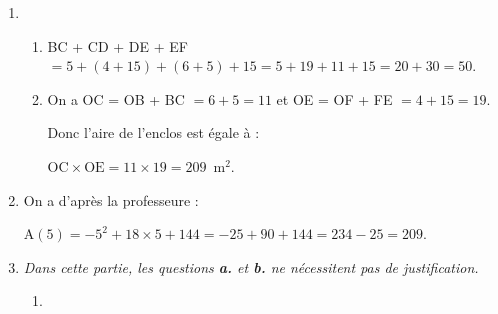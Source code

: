 \begin{enumerate}
\item %
	\begin{enumerate}
		\item %
BC + CD + DE + EF $= 5 +  (4 + 15) + (6 + 5) + 15 = 5 + 19 + 11 + 15 = 20 + 30 = 50$. 
		\item %
		On a OC = OB + BC $= 6 + 5 = 11$ et OE = OF + FE $= 4 + 15 = 19$.
		
Donc l'aire de l'enclos est égale à :

$\text{OC} \times \text{OE} = 11 \times 19 = 209$~m$^2$.
	\end{enumerate}
\item %
	
	
On a d'après la professeure :

A$(5) = - 5^2 + 18\times 5 + 144 = - 25 + 90 + 144 = 234 - 25 = 209$.
\item \emph{Dans cette partie, les questions {\rm\textbf{a.}} et {\rm\textbf{b.}} ne nécessitent pas de justification.}
	\begin{enumerate}
		\item %
		
		

\end{enumerate}
\end{enumerate}
